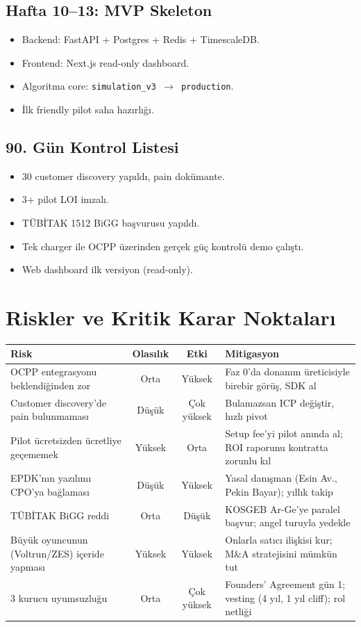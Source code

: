 \documentclass[11pt,a4paper]{article}
\begin{document}
\subsection{Hafta 10--13: MVP Skeleton}
\begin{itemize}
    \item Backend: FastAPI + Postgres + Redis + TimescaleDB.
    \item Frontend: Next.js read-only dashboard.
    \item Algoritma core: \texttt{simulation\_v3 $\rightarrow$ production}.
    \item İlk friendly pilot saha hazırlığı.
\end{itemize}

\subsection{90. Gün Kontrol Listesi}
\begin{itemize}
    \item[$\square$] 30 customer discovery yapıldı, pain dokümante.
    \item[$\square$] 3+ pilot LOI imzalı.
    \item[$\square$] TÜBİTAK 1512 BiGG başvurusu yapıldı.
    \item[$\square$] Tek charger ile OCPP üzerinden gerçek güç kontrolü demo çalıştı.
    \item[$\square$] Web dashboard ilk versiyon (read-only).
\end{itemize}

\section{Riskler ve Kritik Karar Noktaları}

\begin{tabularx}{\textwidth}{X c c X}
\toprule
\textbf{Risk} & \textbf{Olasılık} & \textbf{Etki} & \textbf{Mitigasyon} \\
\midrule
OCPP entegrasyonu beklendiğinden zor & Orta & Yüksek & Faz 0'da donanım üreticisiyle birebir görüş, SDK al \\
Customer discovery'de pain bulunmaması & Düşük & Çok yüksek & Bulamazsan ICP değiştir, hızlı pivot \\
Pilot ücretsizden ücretliye geçememek & Yüksek & Orta & Setup fee'yi pilot anında al; ROI raporunu kontratta zorunlu kıl \\
EPDK'nın yazılımı CPO'ya bağlaması & Düşük & Yüksek & Yasal danışman (Esin Av., Pekin Bayar); yıllık takip \\
TÜBİTAK BiGG reddi & Orta & Düşük & KOSGEB Ar-Ge'ye paralel başvur; angel turuyla yedekle \\
Büyük oyuncunun (Voltrun/ZES) içeride yapması & Yüksek & Yüksek & Onlarla satıcı ilişkisi kur; M\&A stratejisini mümkün tut \\
3 kurucu uyumsuzluğu & Orta & Çok yüksek & Founders' Agreement gün 1; vesting (4 yıl, 1 yıl cliff); rol netliği \\
\bottomrule
\end{tabularx}
\end{document}
